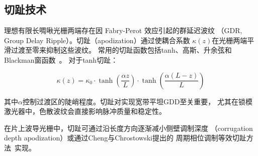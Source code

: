 \documentclass[12pt,a4paper,twoside]{article}
\begin{document}
\subsection{切趾技术}

理想有限长啁啾光栅两端存在因 Fabry-Perot 效应引起的群延迟波纹
（GDR, Group Delay Ripple）。切趾（apodization）通过使耦合系数
$\kappa(z)$在光栅两端平滑过渡至零来抑制这些波纹。
常用的切趾函数包括tanh、高斯、升余弦和Blackman窗函数~\cite{sinobad2025}。
对于tanh切趾：

\begin{equation}
\kappa(z) = \kappa_0 \cdot \tanh\!\left(\frac{\alpha z}{L}\right)
            \cdot \tanh\!\left(\frac{\alpha(L-z)}{L}\right)
\label{eq:apod}
\end{equation}

其中$\alpha$控制过渡区的陡峭程度。切趾对实现宽带平坦GDD至关重要，
尤其在锁模激光器中，色散波纹会直接影响脉冲质量和稳定性。

在片上波导光栅中，切趾可通过沿长度方向逐渐减小侧壁调制深度
（corrugation depth apodization）或通过Cheng与Chrostowski提出的
周期相位调制等效切趾方法~\cite{cheng2021}实现。
\end{document}
